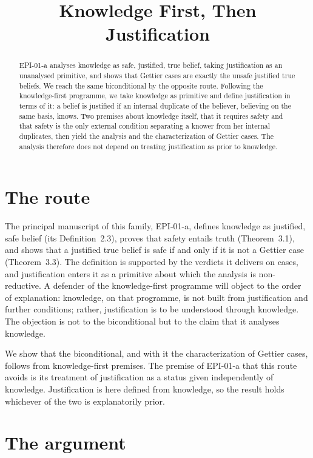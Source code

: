 \documentclass{situationist-preprint}
\title{Knowledge First, Then Justification}
\begin{document}
\maketitle

\begin{abstract}
EPI-01-a analyses knowledge as safe, justified, true belief, taking justification as an unanalysed primitive, and shows that Gettier cases are exactly the unsafe justified true beliefs. We reach the same biconditional by the opposite route. Following the knowledge-first programme, we take knowledge as primitive and define justification in terms of it: a belief is justified if an internal duplicate of the believer, believing on the same basis, knows. Two premises about knowledge itself, that it requires safety and that safety is the only external condition separating a knower from her internal duplicates, then yield the analysis and the characterization of Gettier cases. The analysis therefore does not depend on treating justification as prior to knowledge.
\end{abstract}

\section{The route}

The principal manuscript of this family, EPI-01-a, defines knowledge as justified, safe belief (its Definition~2.3), proves that safety entails truth (Theorem~3.1), and shows that a justified true belief is safe if and only if it is not a Gettier case (Theorem~3.3). The definition is supported by the verdicts it delivers on cases, and justification enters it as a primitive about which the analysis is non-reductive. A defender of the knowledge-first programme \citep{Williamson2000} will object to the order of explanation: knowledge, on that programme, is not built from justification and further conditions; rather, justification is to be understood through knowledge. The objection is not to the biconditional but to the claim that it analyses knowledge.

We show that the biconditional, and with it the characterization of Gettier cases, follows from knowledge-first premises. The premise of EPI-01-a that this route avoids is its treatment of justification as a status given independently of knowledge. Justification is here defined from knowledge, so the result holds whichever of the two is explanatorily prior.

\section{The argument}
\end{document}
